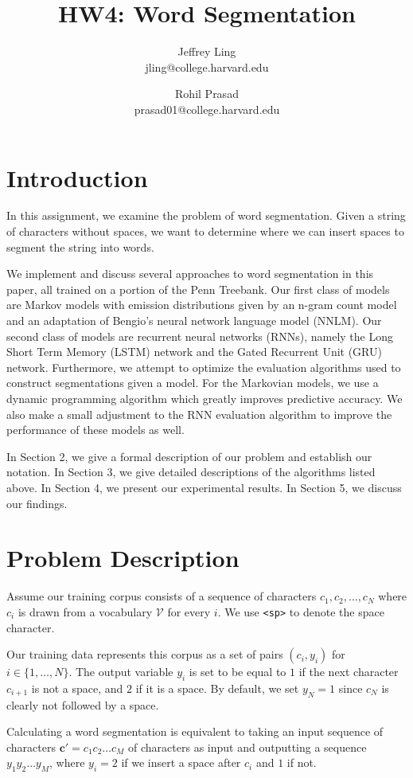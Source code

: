 \documentclass[11pt]{article}
\title{HW4: Word Segmentation}
\author{Jeffrey Ling \\ jling@college.harvard.edu \and Rohil Prasad \\ prasad01@college.harvard.edu }
\begin{document}
\maketitle{}
\section{Introduction}

In this assignment, we examine the problem of word segmentation. Given a string of characters without spaces, we want to determine where we can insert spaces to segment the string into words. 

We implement and discuss several approaches to word segmentation in this paper, all trained on a portion of the Penn Treebank. Our first class of models are Markov models with emission distributions given by an n-gram count model and an adaptation of Bengio's neural network language model (NNLM). Our second class of models are recurrent neural networks (RNNs), namely the Long Short Term Memory (LSTM) network and the Gated Recurrent Unit (GRU) network. Furthermore, we attempt to optimize the evaluation algorithms used to construct segmentations given a model. For the Markovian models, we use a dynamic programming algorithm which greatly improves predictive accuracy. We also make a small adjustment to the RNN evaluation algorithm to improve the performance of these models as well. 

In Section 2, we give a formal description of our problem and establish our notation. In Section 3, we give detailed descriptions of the algorithms listed above. In Section 4, we present our experimental results. In Section 5, we discuss our findings.

\section{Problem Description}

Assume our training corpus consists of a sequence of characters $c_1, c_2, \dots, c_N$ where $c_i$ is drawn from a vocabulary $\mathcal{V}$ for every $i$. We use \texttt{<sp>} to denote the space character. 

Our training data represents this corpus as a set of pairs $(c_i, y_i)$ for $i \in \{1, \dots, N\}$. The output variable $y_i$ is set to be equal to $1$ if the next character $c_{i+1}$ is not a space, and $2$ if it is a space. By default, we set $y_N = 1$ since $c_N$ is clearly not followed by a space. 

Calculating a word segmentation is equivalent to taking an input sequence of characters $\mathbf{c}' = c_1c_2\dots c_M$ of characters as input and outputting a sequence $y_1y_2\dots y_M$, where $y_i = 2$ if we insert a space after $c_i$ and $1$ if not. 
\end{document}
